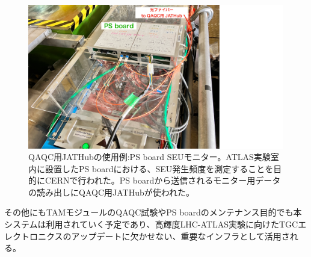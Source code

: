 \begin{figure}
\centering
\includegraphics[width=16cm]{fig/QAQC/JATHubSEU.pdf}
\caption[QAQC用JATHubの使用例:PS board SEUモニター]{QAQC用JATHubの使用例:PS board SEUモニター\cite{mt_hashimoto}。ATLAS実験室内に設置したPS boardにおける、SEU発生頻度を測定することを目的にCERNで行われた。PS boardから送信されるモニター用データの読み出しにQAQC用JATHubが使われた。}
\label{JATHubSEU}
\end{figure}

その他にもTAMモジュールのQAQC試験やPS boardのメンテナンス目的でも本システムは利用されていく予定であり、高輝度LHC-ATLAS実験に向けたTGCエレクトロニクスのアップデートに欠かせない、重要なインフラとして活用される。